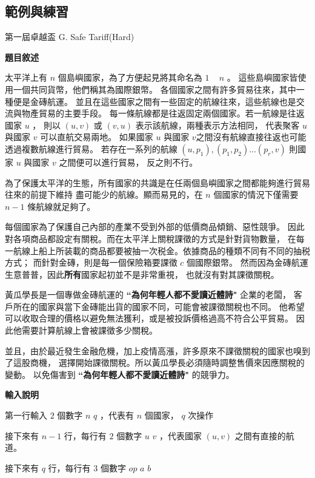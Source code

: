     \subsection{範例與練習}
    \problem 第一屆卓越盃 G. Safe Tariff(Hard)

    \textbf{題目敘述}

    太平洋上有 $n$ 個島嶼國家，為了方便起見將其命名為 $1$ ~ $n$ 。
    這些島嶼國家皆使用一個共同貨幣，他們稱其為國際銀幣。
    各個國家之間有許多貿易往來，其中一種便是金磚航運。
    並且在這些國家之間有一些固定的航線往來，這些航線也是交流與物產貿易的主要手段。
    每一條航線都是往返固定兩個國家。若一航線是往返國家 $u$ ，
    則以 $(u,v)$ 或 $(v,u)$ 表示該航線，兩種表示方法相同，
    代表聚客 $u$ 與國家 $v$ 可以直航交易兩地。
    如果國家 $u$ 與國家 $v$之間沒有航線直接往返也可能透過複數航線進行貿易。
    若存在一系列的航線 $(u,p_1),(p_1,p_2) . . . (p_r,v)$ 則國家 $u$ 與國家 $v$ 之間便可以進行貿易，
    反之則不行。

    為了保護太平洋的生態，所有國家的共識是在任兩個島嶼國家之間都能夠進行貿易往來的前提下維持
    盡可能少的航線。顯而易見的，在 $n$ 個國家的情況下僅需要 $n-1$ 條航線就足夠了。

    每個國家為了保護自己內部的產業不受到外部的低價商品傾銷、惡性競爭。
    因此對各項商品都設定有關稅。而在太平洋上關稅課徵的方式是針對貨物數量，
    在每一航線上船上所装載的商品都要被抽一次税金。依據商品的種類不同有不同的抽税方式；
    而針對金磚，則是每一個保險箱要課徵 $c$ 個國際銀幣。
    然而因為金磚航運生意普普，因此\textbf{所有}國家起初並不是非常重視，
    也就沒有對其課徵關稅。

    黃瓜學長是一個專做金磚航運的 \textbf{``為何年輕人都不愛讀近體詩"} 企業的老闆，
    客戶所在的國家與當下金磚能出貨的國家不同，可能會被課徵關稅也不同。
    他希望可以收取合理的價格以避免無法獲利，或是被投訴價格過高不符合公平貿易。
    因此他需要計算航線上會被課徵多少關稅。

    並且，由於最近發生金融危機，加上疫情高漲，許多原來不課徵關稅的國家也嗅到了這股商機，
    選擇開始課徵關稅。所以黃瓜學長必須隨時調整售價來因應關稅的變動。
    以免傷害到 \textbf{``為何年輕人都不愛讀近體詩"} 的競爭力。

    \textbf{輸入說明}

    第一行輸入 $2$ 個數字 $n$ $q$ ，代表有 $n$ 個國家， $q$ 次操作
    
    接下來有 $n-1$ 行，每行有 $2$ 個數字 $u$ $v$ ，代表國家 $(u,v)$ 之間有直接的航道。
    
    接下來有 $q$ 行，每行有 $3$ 個數字 $op$ $a$ $b$
    
